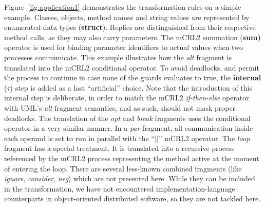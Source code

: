 \documentclass[letter]{llncs}
\begin{document}
Figure~\ref{fig:application1} demonstrates the transformation rules on a simple example. 
Classes, objects, method names and string values
are represented by enumerated data types (\textbf{struct}). 
Replies are distinguished from their respective method calls, as they may also carry
parameters. The mCRL2 summation (\textbf{sum)} operator is used for binding parameter identifiers to actual values when two processes communicate. 
This example illustrates how the \emph{alt} fragment is translated into the mCRL2 conditional operator. To avoid deadlocks, and permit the process
to continue in case none of the guards evaluates to true, the \textbf{internal} (${\tau}$) step is added as a last ``artificial'' choice. 
Note that the introduction of this internal step is deliberate, in order to match the mCRL2 \emph{if-then-else} operator with 
UML's \emph{alt} fragment semantics, and as such, should not mask proper deadlocks.
The translation
of the \textit{opt} and \textit{break} fragments uses the conditional operator in a very similar manner. In a \textit{par} fragment,
all communication inside each operand is set to run in parallel with the  ``${||}$'' mCRL2 operator.
The \textit{loop} fragment has a special treatment. It is translated into a recursive process referenced by the mCRL2 process representing
the method active at the moment of entering the loop.
There are several less-known combined fragments (like \emph{ignore}, \emph{consider}, \emph{neg}) which are not presented here. 
While they can be included in the transformation, we have not encountered implementation-language counterparts in
object-oriented distributed software, so they are not tackled here.
\end{document}
